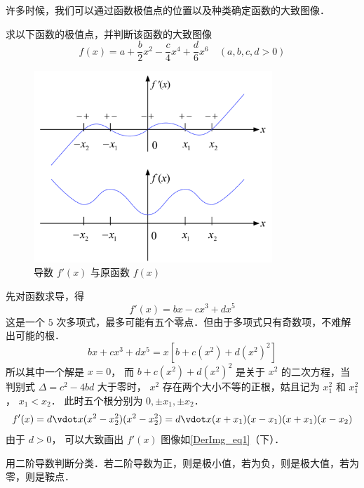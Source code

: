

许多时候，我们可以通过函数极值点的位置以及种类确定函数的大致图像．

\begin{exam}{}
求以下函数的极值点，并判断该函数的大致图像
\begin{equation}
f(x) = a + \frac{b}{2}{x^2} - \frac{c}{4}{x^4} + \frac{d}{6}{x^6} \quad (a,b,c,d >0)
\end{equation}

\begin{figure}[ht]
\centering
\includegraphics[width=9cm]{./figures/DerImg.pdf}
\caption{导数 $f'(x)$ 与原函数 $f(x)$}\label{DerImg_eq1}
\end{figure}

先对函数求导，得
\begin{equation}
f'(x) = bx - c{x^3} + d{x^5} 
\end{equation}
这是一个 $5$ 次多项式，最多可能有五个零点．但由于多项式只有奇数项，不难解出可能的根．
 \begin{equation}
bx + c x^3 + d x^5 = x[b + c(x^2) + d(x^2)^2 ]
\end{equation}
所以其中一个解是 $x = 0$， 而 $b + c({x^2}) + d{({x^2})^2}$ 是关于 ${x^2}$ 的二次方程，当判别式 $\Delta  = c^2 - 4bd$ 大于零时， ${x^2}$ 存在两个大小不等的正根，姑且记为 $x_1^2$ 和 $x_1^2$， $x_1 < x_2$． 
此时五个根分别为 $0, \pm {x_1},\pm {x_2}$． 
\begin{equation}
f'(x) = d \vdot x (x^2 - x_2^2) (x^2 - x_2^2) = d \vdot x (x + x_1)(x - x_1)(x + x_1)(x - x_2)
\end{equation} 
由于 $d > 0$， 可以大致画出 $f'(x)$ 图像如\autoref{DerImg_eq1}（下）．

用二阶导数判断分类．若二阶导数为正，则是极小值，若为负，则是极大值，若为零，则是鞍点．
\end{exam}
